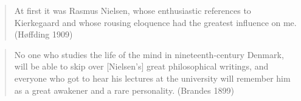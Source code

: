 \documentclass[ignorenonframetext, ]{beamer}
\begin{document}
\begin{frame}

\begin{quote}
  At first it was Rasmus Nielsen, whose enthusiastic references to
  Kierkegaard and whose rousing eloquence had the greatest influence
  on me. (Høffding 1909)
\end{quote}

\bigskip

\begin{quote}
  No one who studies the life of the mind in nineteenth-century
  Denmark, will be able to skip over [Nielsen's] great philosophical
  writings, and everyone who got to hear his lectures at the
  university will remember him as a great awakener and a rare
  personality. (Brandes 1899)
\end{quote}
\end{frame}
\end{document}
